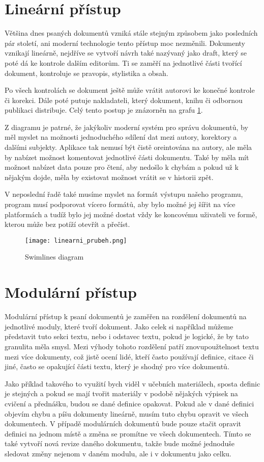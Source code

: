 \section{Lineární přístup}

Většina dnes psaných dokumentů vzniká stále stejným způsobem jako posledních pár století, ani moderní technologie tento přístup moc nezměnili.
Dokumenty vznikají lineárně, nejdříve se vytvoří návrh také nazývaný jako draft, který se poté dá ke kontrole dalším editorům. Ti se zaměří
na jednotlivé části tvořící dokument, kontroluje se pravopis, stylistika a obsah.

Po všech kontrolách se dokument ještě může vrátit autorovi ke konečné kontrole či korekci. Dále poté putuje nakladateli, který dokument,
knihu či odbornou publikaci distribuje. Celý tento postup je znázorněn na grafu \ref{fig:linflow}.

Z diagramu je patrné, že jakýkoliv moderní systém pro správu dokumentů, by měl myslet na možnosti jednoduchého sdílení dat mezi autory, korektory a dalšími
subjekty. Aplikace tak nemusí být čistě oreintována na autory, ale měla by nabízet možnost komentovat jednotlivé části dokumentu. Také by měla mít možnost
nabízet data pouze pro čtení, aby nedošlo k chybám a pokud už k nějakým dojde, měla by existovat možnost vrátit se v historii zpět.

V neposlední řadě také musíme myslet na formát výstupu našeho programu, program musí podporovat vícero formátů, aby bylo možné jej šířit na více platformách
a tudíž bylo jej možné dostat vždy ke koncovému uživateli ve formě, kterou může bez potíží otevřít a přečíst.

\begin{figure}[h]
    \centering
    \texttt{[image: linearni\_prubeh.png]}
    \caption{Swimlines diagram}
    \label{fig:linflow}
\end{figure}

\section{Modulární přístup}

Modulární přístup k psaní dokumentů je zaměřen na rozdělení dokumentů na jednotlivé moduly, které tvoří dokument. Jako celek si například můžeme představit tuto sekci
textu, nebo i odstavec textu, pokud je logické, že by tato granulita měla smysl. Mezi výhody tohoto rozdělení patří znovupoužtelnost textu mezi více dokumenty, což jistě ocení
lidé, kteří často používají definice, citace či jiné, často se opakující části textu, který je shodný pro více dokumentů.

Jako příklad takového to využití bych viděl v učebních materiálech, sposta definic je stejných a pokud se mají tvořit materiály v podobě nějakých výpisek na cvičení a přednášku,
budou se dané definice opakovat. Pokud ale v dané definici objevím chybu a píšu dokumenty lineárně, musím tuto chybu opravit ve všech dokumentech. V případě modulárních dokumentů
bude pouze stačit opravit definici na jednom místě a změna se promítne ve všech dokumentech. Tímto se také vytvoří nová revize daného dokumentu, takže bude možné jednoduše
sledovat změny nejenom v daném modulu, ale i v dokumentu jako celku.
